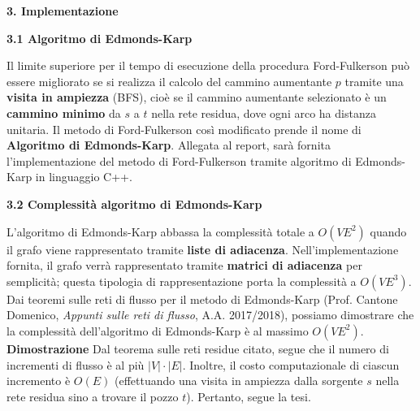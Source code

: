\documentclass{article}
\begin{document}
\newpage
\begin{flushleft}
\huge \textbf{3. Implementazione}
\newline
\newline
\normalsize
\hfill
\newline
\begin{Large} \textbf{3.1 Algoritmo di Edmonds-Karp} \end{Large}
\newline
\newline
Il limite superiore per il tempo di esecuzione della procedura Ford-Fulkerson può essere migliorato se si realizza il calcolo del cammino aumentante $p$ tramite una \textbf{visita in ampiezza} (BFS), cioè se il cammino aumentante selezionato è un \textbf{cammino minimo} da $s$ a $t$ nella rete residua, dove ogni arco ha distanza unitaria.
\newline
Il metodo di Ford-Fulkerson così modificato prende il nome di \textbf{Algoritmo di Edmonds-Karp}.
Allegata al report, sarà fornita l'implementazione del metodo di Ford-Fulkerson tramite algoritmo di Edmonds-Karp in linguaggio C++.
\end{flushleft}
\begin{flushleft}
\hfill
\newline
\begin{Large} \textbf{3.2 Complessità algoritmo di Edmonds-Karp}\end{Large}
\newline
\newline
L'algoritmo di Edmonds-Karp abbassa la complessità totale a $O(VE^2)$ quando il grafo viene rappresentato tramite \textbf{liste di adiacenza}.
\newline
Nell'implementazione fornita, il grafo verrà rappresentato tramite \textbf{matrici di adiacenza} per semplicità; questa tipologia di rappresentazione porta la complessità a $O(VE^3)$.
\newline
Dai teoremi sulle reti di flusso per il metodo di Edmonds-Karp (Prof. Cantone Domenico, \textit{Appunti sulle reti di flusso}, A.A. 2017/2018), possiamo dimostrare che la complessità dell'algoritmo di Edmonds-Karp è al massimo $O(VE^2)$.
\newline
\newline
 \textbf{Dimostrazione}
\newline 
\newline
Dal teorema sulle reti residue citato, segue che il numero di incrementi di flusso è al più $|V| \cdot |E|$. Inoltre, il costo computazionale di ciascun incremento è $O(E)$ (effettuando una visita in ampiezza dalla sorgente $s$
 nella rete residua sino a trovare il pozzo $t$). Pertanto, segue la tesi.
\end{flushleft}
\end{document}
